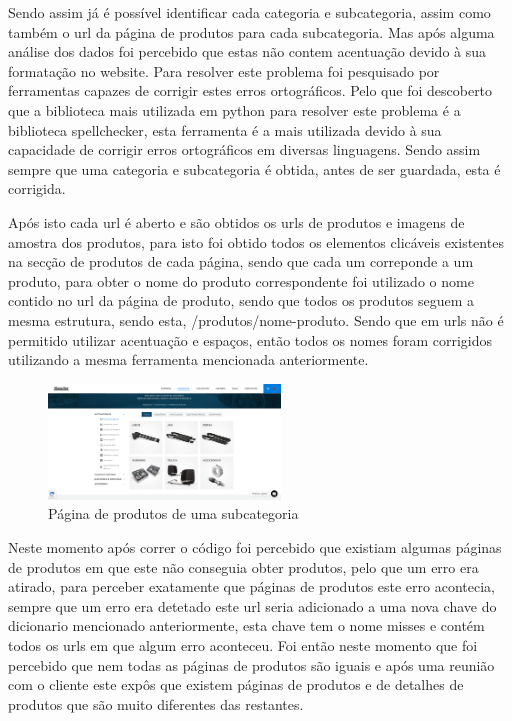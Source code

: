 Sendo assim já é possível identificar cada categoria e subcategoria, assim como também o url da página de produtos
para cada subcategoria. Mas após alguma análise dos dados foi percebido que estas não contem acentuação devido à 
sua formatação no website. Para resolver este problema foi pesquisado por ferramentas capazes de corrigir estes
erros ortográficos. Pelo que foi descoberto que a biblioteca mais utilizada em python para resolver este problema 
é a biblioteca spellchecker, esta ferramenta é a mais utilizada devido à sua capacidade de corrigir erros ortográficos
em diversas linguagens. Sendo assim sempre que uma categoria e subcategoria é obtida, antes de ser guardada, esta é corrigida.

Após isto cada url é aberto e são obtidos os urls de produtos e imagens de amostra dos produtos, para isto foi obtido todos os
elementos clicáveis existentes na secção de produtos de cada página, sendo que cada um correponde a um produto, para obter o nome
do produto correspondente foi utilizado o nome contido no url da página de produto, sendo que todos os produtos seguem a mesma 
estrutura, sendo esta, /produtos/nome-produto. Sendo que em urls não é permitido utilizar acentuação e espaços, então todos os 
nomes foram corrigidos utilizando a mesma ferramenta mencionada anteriormente.

\begin{figure}[htb]
    \centering
    
    \includegraphics[width=0.55\textwidth]{images/implementacao/scraper/pagina_produtos_subcat.png}
    \caption{Página de produtos de uma subcategoria}
    \label{fig:51}
\end{figure}

\newpage
Neste momento após correr o código foi percebido que existiam algumas páginas de produtos em que este não conseguia obter produtos,
pelo que um erro era atirado, para perceber exatamente que páginas de produtos este erro acontecia, sempre que um erro era detetado
este url seria adicionado a uma nova chave do dicionario mencionado anteriormente, esta chave tem o nome misses e contém todos os urls
em que algum erro aconteceu. Foi então neste momento que foi percebido que nem todas as páginas de produtos são iguais e após uma
reunião com o cliente este expôs que existem páginas de produtos e de detalhes de produtos que são muito diferentes das restantes.


